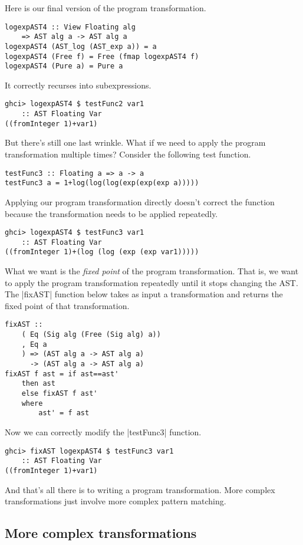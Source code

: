 \documentclass[preprint]{sigplanconf}
\theoremstyle{definition}
\begin{document}
Here is our final version of the program transformation.
\begin{lstlisting}
logexpAST4 :: View Floating alg
    => AST alg a -> AST alg a
logexpAST4 (AST_log (AST_exp a)) = a
logexpAST4 (Free f) = Free (fmap logexpAST4 f)
logexpAST4 (Pure a) = Pure a
\end{lstlisting}
It correctly recurses into subexpressions.
\begin{lstlisting}
ghci> logexpAST4 $ testFunc2 var1
    :: AST Floating Var
((fromInteger 1)+var1)
\end{lstlisting}
But there's still one last wrinkle.
What if we need to apply the program transformation multiple times?
Consider the following test function.
\begin{lstlisting}
testFunc3 :: Floating a => a -> a
testFunc3 a = 1+log(log(log(exp(exp(exp a)))))
\end{lstlisting}
Applying our program transformation directly doesn't correct the function because the transformation needs to be applied repeatedly.
\begin{lstlisting}
ghci> logexpAST4 $ testFunc3 var1
    :: AST Floating Var
((fromInteger 1)+(log (log (exp (exp var1)))))
\end{lstlisting}
What we want is the \emph{fixed point} of the program transformation.
That is, we want to apply the program transformation repeatedly until it stops changing the AST.
The |fixAST| function below takes as input a transformation and returns the fixed point of that transformation.
\begin{lstlisting}
fixAST ::
    ( Eq (Sig alg (Free (Sig alg) a))
    , Eq a
    ) => (AST alg a -> AST alg a)
      -> (AST alg a -> AST alg a)
fixAST f ast = if ast==ast'
    then ast
    else fixAST f ast'
    where
        ast' = f ast
\end{lstlisting}
Now we can correctly modify the |testFunc3| function.
\begin{lstlisting}
ghci> fixAST logexpAST4 $ testFunc3 var1
    :: AST Floating Var
((fromInteger 1)+var1)
\end{lstlisting}
And that's all there is to writing a program transformation.
More complex transformations just involve more complex pattern matching.

\subsection{More complex transformations}
\end{document}
